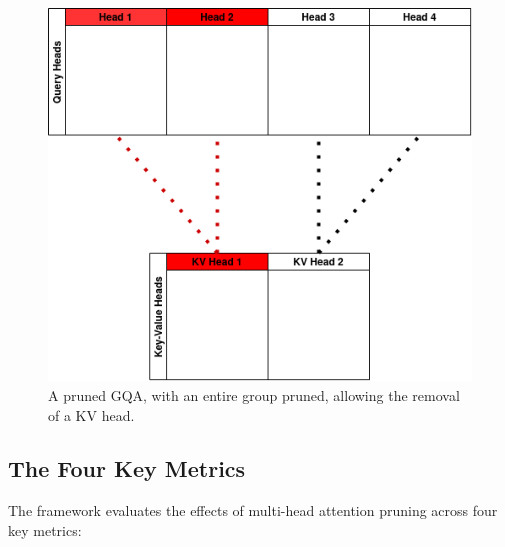 \documentclass[conference]{IEEEtran}
\begin{document}
    \begin{figure}[!htbp]
        \centerline{\includegraphics[width=0.66\columnwidth]{Pruned GQA 2}}
        \caption{A pruned GQA, with an entire group pruned, allowing the removal of a KV head.}
        \label{fig:gqa3}
    \end{figure}
    \clearpage

    \subsection{The Four Key Metrics}

    The framework evaluates the effects of multi-head attention pruning across four key metrics:
\end{document}
